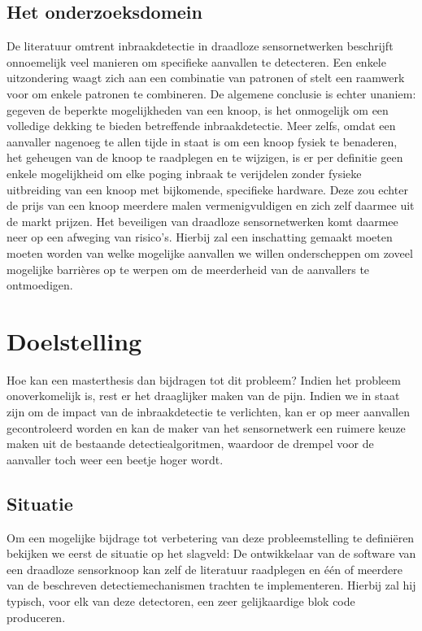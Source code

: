 \documentclass[12pt,a4paper]{article}
\begin{document}
\subsection*{Het onderzoeksdomein}

De literatuur omtrent inbraakdetectie in draadloze sensornetwerken beschrijft
onnoemelijk veel manieren om specifieke aanvallen te detecteren. Een enkele
uitzondering waagt zich aan een combinatie van patronen of stelt een raamwerk
voor om enkele patronen te combineren. De algemene conclusie is echter unaniem:
gegeven de beperkte mogelijkheden van een knoop, is het onmogelijk om een
volledige dekking te bieden betreffende inbraakdetectie. Meer zelfs, omdat een
aanvaller nagenoeg te allen tijde in staat is om een knoop fysiek te benaderen,
het geheugen van de knoop te raadplegen en te wijzigen, is er per definitie
geen enkele mogelijkheid om elke poging inbraak te verijdelen zonder fysieke
uitbreiding van een knoop met bijkomende, specifieke hardware. Deze zou echter
de prijs van een knoop meerdere malen vermenigvuldigen en zich zelf daarmee uit
de markt prijzen. Het beveiligen van draadloze sensornetwerken komt daarmee
neer op een afweging van risico's. Hierbij zal een inschatting gemaakt moeten
moeten worden van welke mogelijke aanvallen we willen onderscheppen om zoveel
mogelijke barri\`eres op te werpen om de meerderheid van de aanvallers te
ontmoedigen.

\section*{Doelstelling}

Hoe kan een masterthesis dan bijdragen tot dit probleem? Indien het probleem
onoverkomelijk is, rest er het draaglijker maken van de pijn. Indien we in
staat zijn om de impact van de inbraakdetectie te verlichten, kan er op meer
aanvallen gecontroleerd worden en kan de maker van het sensornetwerk een
ruimere keuze maken uit de bestaande detectiealgoritmen, waardoor de drempel
voor de aanvaller toch weer een beetje hoger wordt.

\subsection*{Situatie}

Om een mogelijke bijdrage tot verbetering van deze probleemstelling te
defini\"eren bekijken we eerst de situatie op het slagveld: De ontwikkelaar van
de software van een draadloze sensorknoop kan zelf de literatuur raadplegen en
\'e\'en of meerdere van de beschreven detectiemechanismen trachten te
implementeren. Hierbij zal hij typisch, voor elk van deze detectoren, een zeer
gelijkaardige blok code produceren.
\end{document}
